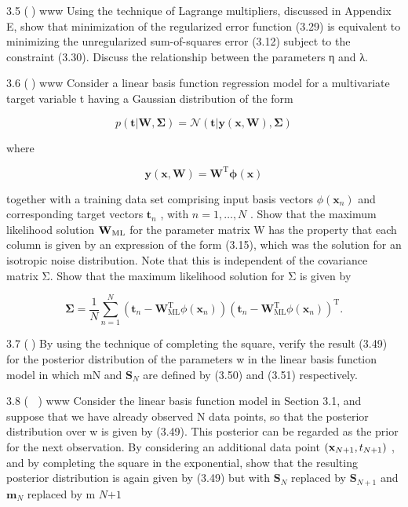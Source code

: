\documentclass[
  10
]{article}
\begin{document}
3.5 () www Using the technique of Lagrange multipliers, discussed in
Appendix E, show that minimization of the regularized error function
(3.29) is equivalent to minimizing the unregularized sum-of-squares
error (3.12) subject to the constraint (3.30). Discuss the relationship
between the parameters η and λ.

3.6 () www Consider a linear basis function regression model for a
multivariate target variable t having a Gaussian distribution of the
form

\[
p (\mathbf {t} | \mathbf {W}, \boldsymbol {\Sigma}) = \mathcal {N} (\mathbf {t} | \mathbf {y} (\mathbf {x}, \mathbf {W}), \boldsymbol {\Sigma})\tag{3.107}
\]

where

\[
\mathbf {y} (\mathbf {x}, \mathbf {W}) = \mathbf {W} ^ {\mathrm{T}} \boldsymbol {\phi} (\mathbf {x})\tag{3.108}
\]

together with a training data set comprising input basis vectors
\(\phi (  { \mathbf { x } } _ { n } )\) and corresponding target vectors
\(\mathbf { t } _ { n }\) , with \(n = 1 , \ldots , N\) . Show that the
maximum likelihood solution \({ \bf W } _ { \mathrm { M L } }\) for the
parameter matrix W has the property that each column is given by an
expression of the form (3.15), which was the solution for an isotropic
noise distribution. Note that this is independent of the covariance
matrix Σ. Show that the maximum likelihood solution for Σ is given by

\[
\pmb {\Sigma} = \frac {1}{N} \sum_ {n = 1} ^ {N} \left(\mathbf {t} _ {n} - \mathbf {W} _ {\mathrm{ML}} ^ {\mathrm{T}} \phi (\mathbf {x} _ {n})\right) \left(\mathbf {t} _ {n} - \mathbf {W} _ {\mathrm{ML}} ^ {\mathrm{T}} \phi (\mathbf {x} _ {n})\right) ^ {\mathrm{T}}.\tag{3.109}
\]

3.7 () By using the technique of completing the square, verify the
result (3.49) for the posterior distribution of the parameters w in the
linear basis function model in which mN and \(\mathbf { S } _ { N }\)
are defined by (3.50) and (3.51) respectively.

3.8 ( ) www Consider the linear basis function model in Section 3.1, and
suppose that we have already observed N data points, so that the
posterior distribution over w is given by (3.49). This posterior can be
regarded as the prior for the next observation. By considering an
additional data point
\(\left( { \bf x } _ { N + 1 } , t _ { N + 1 } \right)\) , and by
completing the square in the exponential, show that the resulting
posterior distribution is again given by (3.49) but with
\(\mathbf { S } _ { N }\) replaced by \(\mathbf { S } _ { N + 1 }\) and
\(\mathbf { m } _ { N }\) replaced by m \(N { + 1 }\)
\end{document}
